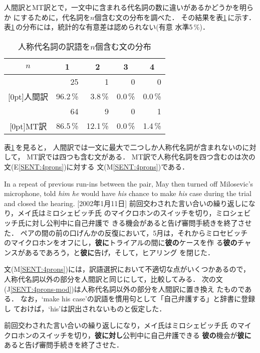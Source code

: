 人間訳とMT訳とで，一文中に含まれる代名詞の数に違いがあるかどうかを明らか
にするために，代名詞を$n$個含む文の分布を調べた．
その結果を表\ref{tab:num-of-pron}\,に示す．
表\ref{tab:num-of-pron}\,の分布には，統計的な有意差は認められない(有意
水準5\,\%)．
\begin{table}[htbp]
\caption{人称代名詞の訳語を$n$個含む文の分布}
\label{tab:num-of-pron}
\begin{center}
\begin{tabular}{|c||r|r|r|r|}\hline
$n$ & \multicolumn{1}{|c}{1} & \multicolumn{1}{|c}{2} & 
\multicolumn{1}{|c}{3} & \multicolumn{1}{|c|}{4} \\\hline\hline
 & 25 &  1 & 0 & 0 \\
\raisebox{1.5ex}[0pt]{人間訳} & 96.2\,\% & 3.8\,\% & 0.0\,\% & 0.0\,\% \\\hline
 & 64 & 9 & 0 & 1 \\
\raisebox{1.5ex}[0pt]{MT訳} & 86.5\,\% & 12.1\,\% & 0.0\,\% & 1.4\,\% \\\hline
\end{tabular}
\end{center}
\end{table}

表\ref{tab:num-of-pron}\,を見ると，
人間訳では一文に最大で二つしか人称代名詞が含まれないのに対して，
MT訳では四つも含む文がある．
MT訳で人称代名詞を四つ含むのは次の文(E\ref{SENT:4prons})に対する
文(M\ref{SENT:4prons})である． 
\begin{SENT2}
\sentE In a repeat of previous run-ins between the pair, May then turned 
off Milosevic's microphone, told {\it him} {\it he} would have {\it his} 
chance to make {\it his} case during the trial and closed the hearing. 
[2002年1月11日] 
\sentH 前回交わされた言い合いの繰り返しになり，メイ氏はミロシェビッチ氏
のマイクロホンのスイッチを切り，ミロシェビッチ氏に対し公判中に自己弁護で
きる機会があると告げ審問手続きを終了させた．
\sentM ペアの間の前の口げんかの反復において，5月は，それからミロセビッチ
のマイクロホンをオフにし，{\bf 彼に}トライアルの間に{\bf 彼の}ケースを作
る{\bf 彼の}チャンスがあるであろう，と{\bf 彼に}告げ，そして，ヒアリング
を閉じた．
\label{SENT:4prons}
\end{SENT2}

文(M\ref{SENT:4prons})には，訳語選択において不適切な点がいくつかあるので，
人称代名詞以外の部分を人間訳と同じにして，比較してみる．
次の文(J\ref{SENT:4prons-mod})は人称代名詞以外の部分を人間訳に置き換え
たものである．
なお，`make his case'の訳語を慣用句として「自己弁護する」と辞書に登録し
ておけば，`his'は訳出されないものと仮定した．
\begin{JSENT}
\sentJ 前回交わされた言い合いの繰り返しになり，メイ氏はミロシェビッチ氏
のマイクロホンのスイッチを切り，{\bf 彼に対し}公判中に自己弁護できる
{\bf 彼の}機会が{\bf 彼に}あると告げ審問手続きを終了させた．
\label{SENT:4prons-mod}
\end{JSENT}

